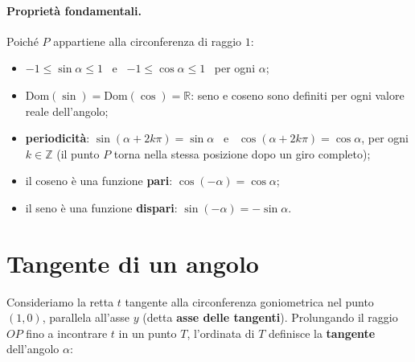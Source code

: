 \documentclass[11pt,a4paper]{article}
\newcommand{\formulabox}[1]{%
  \begin{center}
  \fbox{\parbox{0.9\linewidth}{\centering\vspace{2pt}#1\vspace{2pt}}}
  \end{center}
}
\begin{document}
\paragraph{Propriet\`a fondamentali.} Poich\'e $P$ appartiene alla circonferenza di raggio $1$:
\begin{itemize}[nosep]
\item $-1 \le \sin\alpha \le 1$ \ e \ $-1 \le \cos\alpha \le 1$ \ per ogni $\alpha$;
\item $\mathrm{Dom}(\sin) = \mathrm{Dom}(\cos) = \mathbb{R}$: seno e coseno sono definiti per ogni valore reale dell'angolo;
\item \textbf{periodicit\`a}: $\sin(\alpha + 2k\pi) = \sin\alpha$ \ e \ $\cos(\alpha + 2k\pi) = \cos\alpha$, per ogni $k\in\mathbb{Z}$ (il punto $P$ torna nella stessa posizione dopo un giro completo);
\item il coseno \`e una funzione \textbf{pari}: $\cos(-\alpha) = \cos\alpha$;
\item il seno \`e una funzione \textbf{dispari}: $\sin(-\alpha) = -\sin\alpha$.
\end{itemize}

\section{Tangente di un angolo}

Consideriamo la retta $t$ tangente alla circonferenza goniometrica nel punto $(1,0)$, parallela all'asse $y$ (detta \textbf{asse delle tangenti}). Prolungando il raggio $OP$ fino a incontrare $t$ in un punto $T$, l'ordinata di $T$ definisce la \textbf{tangente} dell'angolo $\alpha$:

\formulabox{$\tan\alpha = \dfrac{\sin\alpha}{\cos\alpha} \qquad (\cos\alpha \neq 0)$}

\begin{center}
\end{center}
\end{document}
